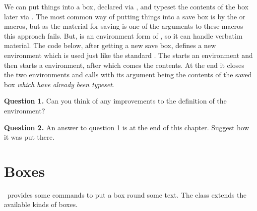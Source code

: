     We can put things into a box, declared via \cmd{\newsavebox}, and typeset
the contents of the box later via \cmd{\usebox}. The most common way
of putting things into a save box is by the \cmd{\sbox} or \cmd{\savebox}
macros, but as the material for saving is one of the arguments to these 
macros this approach fails. But,  is an environment form of
\cmd{\sbox}, so it can handle verbatim material. The code below,
after getting a new save box, defines a new  
environment which is used just 
like the standard . 
The  
starts an  environment and then
starts a  environment, after which comes the contents.
At the end it closes the two environments and calls \cmd{\fbox} with its
argument being the contents of the saved box \emph{which have already been
typeset}.
\begin{lcode}
\newsavebox{\minibox}
\newenvironment{framedminipage}[1]{%
  \begin{lrbox}{\minibox}\begin{minipage}{#1}}%
  {\end{minipage}\end{lrbox}\fbox{\usebox{\minibox}}}
\end{lcode}

\vspace{\onelineskip}
\noindent\textbf{Question 1.} Can you think of any improvements to
  the definition of the  environment?

\vspace{\onelineskip}
\noindent\textbf{Question 2.} An answer to question 1 is at the end of this
  chapter. Suggest how it was put there.



\section{Boxes}


    \ltx\ provides some commands to put a box round some text. The class
extends the available kinds of boxes.


